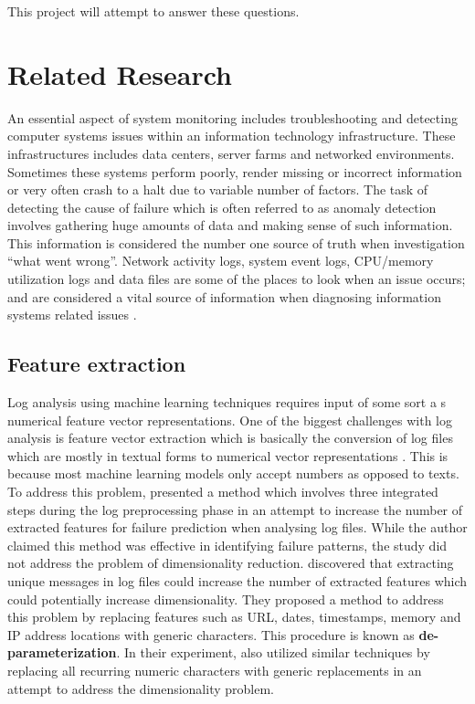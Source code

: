 \documentclass[12pt, letterpaper, titlepage]{report}
\begin{document}
This project will attempt to answer these questions.

\section{Related Research}
An essential aspect of system monitoring includes troubleshooting and detecting computer systems issues within an information technology infrastructure. These infrastructures includes data centers, server farms and networked environments. Sometimes these systems perform poorly, render missing or incorrect information or very often crash to a halt due to variable number of factors. The task of detecting the cause of failure which is often referred to as anomaly detection involves gathering huge amounts of data and making sense of such information. This information is considered the number one source of truth when investigation “what went wrong”. Network activity logs, system event logs, CPU/memory utilization logs and data files are some of the places to look when an issue occurs; and are considered a vital source of information when diagnosing information systems related issues \citep{saneifar2009mining}.

\subsection{Feature extraction}

Log analysis using machine learning techniques requires input of some sort a s numerical feature vector representations. One of the biggest challenges with log analysis is feature vector extraction which is basically the conversion of log files which are mostly in textual forms to numerical vector representations \citep{oliner2012advances}. This is because most machine learning models only accept numbers as opposed to texts. To address this problem, \cite{zheng2009system} presented a method which involves three integrated steps during the log preprocessing phase in an attempt to increase the number of extracted features for failure prediction when analysing log files. While the author claimed this method was effective in identifying failure patterns, the study did not address the problem of dimensionality reduction. \cite{lim2008log} discovered that extracting unique messages in log files could increase the number of extracted features which could potentially increase dimensionality. They proposed a method to address this problem by replacing features such as URL, dates, timestamps, memory and IP address locations with generic characters. This procedure is known as \textbf{de-parameterization}. In their experiment, \cite{lim2008log} also utilized similar techniques by replacing all recurring numeric characters with generic replacements in an attempt to address the dimensionality problem. 
\end{document}
